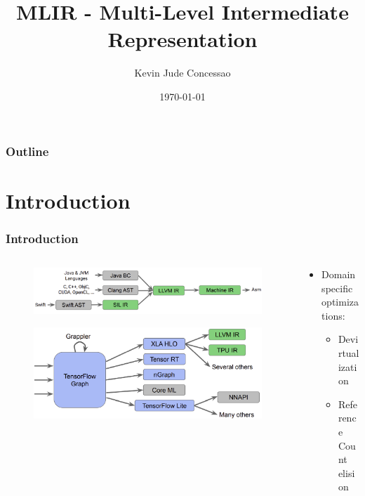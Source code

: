 \documentclass{beamer}
\title{MLIR - Multi-Level Intermediate Representation}
\author{Kevin Jude Concessao}
\institute{IIT Palakkad}
\date{\today}
\begin{document}
\begin{frame}
  \titlepage
\end{frame}

\begin{frame}
  \frametitle{Outline}
  \tableofcontents
\end{frame}

\section{Introduction}
\begin{frame}
  \frametitle{Introduction}
  \begin{columns}
    \begin{column}{0.6\textwidth}
      \begin{figure}[h]
        \centering
        \includegraphics[width=\textwidth]{pictures/Introduction.png}
      \end{figure}
      \begin{figure}[h]
        \centering
        \includegraphics[width=\textwidth]{pictures/IR2.png}
      \end{figure}
    \end{column}
    \begin{column}{0.6\textwidth}
      \footnotesize
      \begin{itemize}
        \footnotesize
        \itemsep0.4em
        \item Domain specific optimizations:
          \begin{itemize}
            \footnotesize
            \itemsep0.4em
            \item Devirtualization
            \item Reference Count elision

\end{itemize}
\end{itemize}
\end{column}
\end{columns}
\end{frame}
\end{document}
